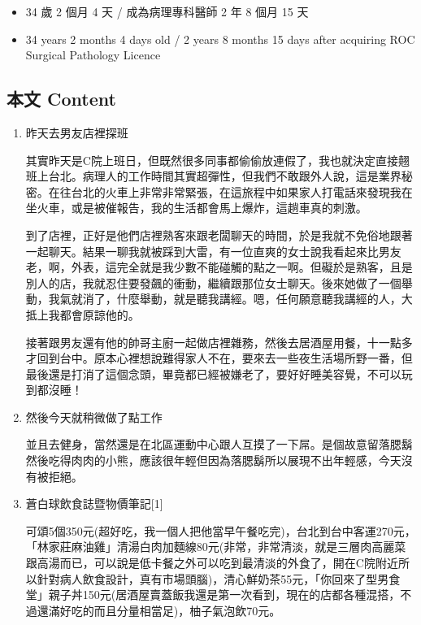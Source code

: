 \documentclass[a5paper, 11pt
]{book}
\providecommand{\tightlist}{%
  \setlength{\itemsep}{0pt}\setlength{\parskip}{0pt}}
\begin{document}
\begin{itemize}
\tightlist
\item
  34 歲 2 個月 4 天 / 成為病理專科醫師 2 年 8 個月 15 天
\item
  34 years 2 months 4 days old / 2 years 8 months 15 days after
  acquiring ROC Surgical Pathology Licence
\end{itemize}

\hypertarget{ux672cux6587-content-26}{%
\subsection{本文 Content}\label{ux672cux6587-content-26}}

\begin{enumerate}
\def\labelenumi{\arabic{enumi}.}
\item
  昨天去男友店裡探班

  其實昨天是C院上班日，但既然很多同事都偷偷放連假了，我也就決定直接翹班上台北。病理人的工作時間其實超彈性，但我們不敢跟外人說，這是業界秘密。在往台北的火車上非常非常緊張，在這旅程中如果家人打電話來發現我在坐火車，或是被催報告，我的生活都會馬上爆炸，這趟車真的刺激。

  到了店裡，正好是他們店裡熟客來跟老闆聊天的時間，於是我就不免俗地跟著一起聊天。結果一聊我就被踩到大雷，有一位直爽的女士說我看起來比男友老，啊，外表，這完全就是我少數不能碰觸的點之一啊。但礙於是熟客，且是別人的店，我就忍住要發飆的衝動，繼續跟那位女士聊天。後來她做了一個舉動，我氣就消了，什麼舉動，就是聽我講經。嗯，任何願意聽我講經的人，大抵上我都會原諒他的。

  接著跟男友還有他的帥哥主廚一起做店裡雜務，然後去居酒屋用餐，十一點多才回到台中。原本心裡想說難得家人不在，要來去一些夜生活場所野一番，但最後還是打消了這個念頭，畢竟都已經被嫌老了，要好好睡美容覺，不可以玩到都沒睡！
\item
  然後今天就稍微做了點工作

  並且去健身，當然還是在北區運動中心跟人互摸了一下屌。是個故意留落腮鬍然後吃得肉肉的小熊，應該很年輕但因為落腮鬍所以展現不出年輕感，今天沒有被拒絕。
\item
  蒼白球飲食誌暨物價筆記{[}1{]}

  可頌5個350元(超好吃，我一個人把他當早午餐吃完)，台北到台中客運270元，「林家莊麻油雞」清湯白肉加麵線80元(非常，非常清淡，就是三層肉高麗菜跟高湯而已，可以說是低卡餐之外可以吃到最清淡的外食了，開在C院附近所以針對病人飲食設計，真有市場頭腦)，清心鮮奶茶55元，「你回來了型男食堂」親子丼150元(居酒屋賣蓋飯我還是第一次看到，現在的店都各種混搭，不過還滿好吃的而且分量相當足)，柚子氣泡飲70元。
\end{enumerate}
\end{document}
